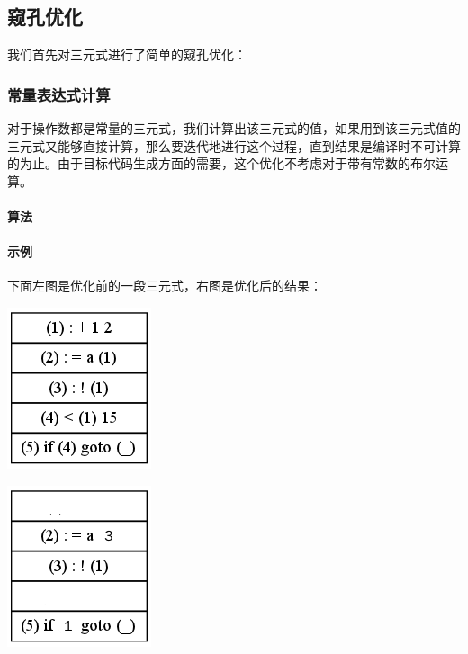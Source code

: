 \subsection{窥孔优化}
\label{peephole:intermidiate}
我们首先对三元式进行了简单的窥孔优化：
\subsubsection{常量表达式计算} 对于操作数都是常量的三元式，我们计算出该三元式的值，如果用到该三元式值的三元式又能够直接计算，那么要迭代地进行这个过程，直到结果是编译时不可计算的为止。由于目标代码生成方面的需要，这个优化不考虑对于带有常数的布尔运算。
\paragraph*{算法}

\paragraph*{示例}
下面左图是优化前的一段三元式，右图是优化后的结果：
\begin{center}
\begin{minipage}{0.4\textwidth}
\begin{center}
	\includegraphics[scale=0.50]{before_const_expr.png}
	\label{fig:beforconstexpr}
\end{center}
\end{minipage}
\begin{minipage}{0.4\textwidth}
\begin{center}
	\includegraphics[scale=0.50]{after_const_expr.png}
	\label{fig:afterconstexpr}
\end{center}
\end{minipage}
\end{center}
